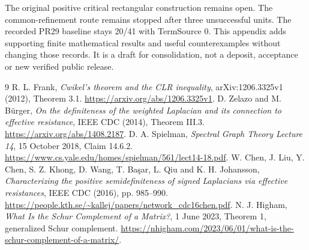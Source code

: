 \documentclass[11pt,a4paper]{article}
\begin{document}
The original positive critical rectangular construction remains open.
The common-refinement route remains stopped after three unsuccessful units.
The recorded PR29 baseline stays 20/41 with TermSource 0. This appendix adds
supporting finite mathematical results and useful counterexamples without
changing those records. It is a draft for consolidation, not a deposit,
acceptance or new verified public release.

\begin{thebibliography}{9}
 R. L. Frank, \emph{Cwikel's theorem and the CLR inequality},
arXiv:1206.3325v1 (2012), Theorem 3.1.
\url{https://arxiv.org/abs/1206.3325v1}.
 D. Zelazo and M. B\"urger, \emph{On the definiteness of the
weighted Laplacian and its connection to effective resistance},
IEEE CDC (2014), Theorem III.3.
\url{https://arxiv.org/abs/1408.2187}.
 D. A. Spielman, \emph{Spectral Graph Theory Lecture 14},
15 October 2018, Claim 14.6.2.
\url{https://www.cs.yale.edu/homes/spielman/561/lect14-18.pdf}.
 W. Chen, J. Liu, Y. Chen, S. Z. Khong, D. Wang,
T. Ba\c{s}ar, L. Qiu and K. H. Johansson, \emph{Characterizing the positive
semidefiniteness of signed Laplacians via effective resistances},
IEEE CDC (2016), pp. 985--990.
\url{https://people.kth.se/~kallej/papers/network_cdc16chen.pdf}.
 N. J. Higham, \emph{What Is the Schur Complement of a Matrix?}, 1 June 2023, Theorem 1, generalized Schur complement. \url{https://nhigham.com/2023/06/01/what-is-the-schur-complement-of-a-matrix/}.
\end{thebibliography}
\end{document}
